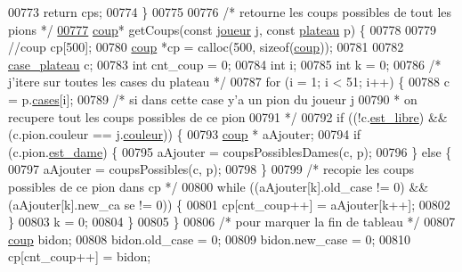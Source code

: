 \begin{DoxyCode}
00773         \textcolor{keywordflow}{return} cps;
00774 \}
00775 
00776 \textcolor{comment}{/* retourne les coups possibles de tout les pions */}
\hypertarget{regles_8c_source_l00777}{}\hyperlink{regles_8h_a7c5456f7077282f58fc370d432ecdf73}{00777} \hyperlink{structcoup}{coup}* getCoups(\textcolor{keyword}{const} \hyperlink{structjoueur}{joueur} j, \textcolor{keyword}{const} \hyperlink{structplateau}{plateau} p) \{
00778 
00779         \textcolor{comment}{//coup cp[500];}
00780         \hyperlink{structcoup}{coup} *cp = calloc(500, \textcolor{keyword}{sizeof}(\hyperlink{structcoup}{coup}));
00781 
00782         \hyperlink{structcase__plateau}{case_plateau} c;
00783         \textcolor{keywordtype}{int} cnt\_coup = 0;
00784         \textcolor{keywordtype}{int} i;
00785         \textcolor{keywordtype}{int} k = 0;
00786         \textcolor{comment}{/* j'itere sur toutes les cases du plateau */}
00787         \textcolor{keywordflow}{for} (i = 1; i < 51; i++) \{
00788                 c = p.\hyperlink{structplateau_a6afaa60f594542e0d742b0c6d3223392}{cases}[i];
00789                 \textcolor{comment}{/* si dans cette case y'a un pion du joueur j}
00790 \textcolor{comment}{                 * on recupere tout les coups possibles de ce pion}
00791 \textcolor{comment}{                 */}
00792                 \textcolor{keywordflow}{if} ((!c.\hyperlink{structcase__plateau_a173f25d2fd7c653d77ca8174ba4f636d}{est_libre}) && (c.pion.couleur == j.\hyperlink{structjoueur_a057f95a41503a890f27c651969ffac8d}{couleur})) \{
00793                         \hyperlink{structcoup}{coup} * aAjouter;
00794                         \textcolor{keywordflow}{if} (c.pion.\hyperlink{structpion_a13d497ed763d6eba18df86caf4c85861}{est_dame}) \{
00795                                 aAjouter = coupsPossiblesDames(c, p);
00796                         \} \textcolor{keywordflow}{else} \{
00797                                 aAjouter = coupsPossibles(c, p);
00798                         \}
00799                         \textcolor{comment}{/* recopie les coups possibles de ce pion dans cp */}
00800                         \textcolor{keywordflow}{while} ((aAjouter[k].old\_case != 0) && (aAjouter[k].new\_ca
      se != 0)) \{
00801                                 cp[cnt\_coup++] = aAjouter[k++];
00802                         \}
00803                         k = 0;
00804                 \}
00805         \}
00806         \textcolor{comment}{/* pour marquer la fin de tableau */}
00807         \hyperlink{structcoup}{coup} bidon;
00808         bidon.old\_case = 0;
00809         bidon.new\_case = 0;
00810         cp[cnt\_coup++] = bidon;

\end{DoxyCode}
